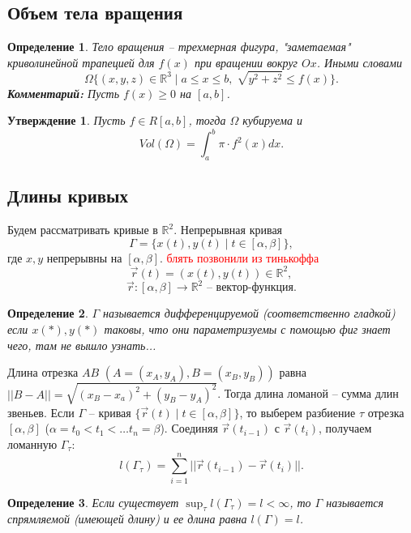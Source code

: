 \documentclass{article}
\theoremstyle{plain}
\newtheorem{claim}{Утверждение}
\newtheorem{definition}{Определение}
\theoremstyle{definition}
\theoremstyle{remark}
\renewcommand{\*}{\cdot}
\begin{document}
\subsection{Объем тела вращения}
\begin{definition}
Тело вращения -- трехмерная фигура, "заметаемая" криволинейной трапецией для $f(x)$ при вращении вокруг $Ox$. Иными словами
$$\Omega \Big\{ (x, y, z)\in \mathbb{R}^3 \;\Big|\; a\leq x\leq b,\; \sqrt{y^2+z^2}\leq f(x) \Big\}.$$
\textbf{Комментарий:} Пусть $f(x) \geq 0$ на $[a, b]$.
\end{definition}

\begin{claim}
Пусть $f\in R[a, b]$, тогда $\Omega$ кубируема и 
$$Vol(\Omega) = \int_a^b \pi\cdot f^2(x)dx.$$
\end{claim}

\subsection{Длины кривых}
Будем рассматривать кривые в $\mathbb{R}^2$. 
Непрерывная кривая $$\Gamma = \Big\{x(t), y(t)\;\Big|\;t\in[\alpha, \beta]\Big\},$$ где $x, y$ непрерывны на $[\alpha, \beta]$.  
\textcolor{red}{блять позвонили из тинькоффа} 
$$\overrightarrow{r}(t) = (x(t), y(t)) \in \mathbb{R}^2,$$
$$\overrightarrow{r} : [\alpha, \beta] \rightarrow \mathbb{R}^2 \text{ -- вектор-функция.}$$
\begin{definition}
$\Gamma$ называется дифференцируемой (соответственно гладкой) если $x(*), y(*)$ таковы, что они параметризуемы с помощью фиг знает чего, там не вышло узнать...
\end{definition}


Длина отрезка $AB$ $(A=(x_A, y_A), B = (x_B, y_B))$ равна $||B-A|| = \sqrt{(x_B -x_a)^2 + (y_B-y_A)^2}$.
Тогда длина ломаной -- сумма длин звеньев.
Если $\Gamma$ -- кривая $\Big\{\overrightarrow{r}(t)\; | \; t \in [\alpha, \beta]\Big\}$, то выберем разбиение $\tau$ отрезка $[\alpha, \beta]$ ($\alpha = t_0<t_1<\ldots t_{n} =\beta$).
Соединяя $\overrightarrow{r}(t_{i-1})$ с $\overrightarrow{r}(t_i)$, получаем ломанную $\Gamma_{\tau}$:
$$l(\Gamma_{\tau}) = \sum_{i=1}^{n} ||\overrightarrow{r}(t_{i-1}) - \overrightarrow{r}(t_i) ||.$$

\begin{definition}
Если существует $\sup_{\tau} l(\Gamma_{\tau}) = l< \infty$, то $\Gamma$ называется спрямляемой (имеющей длину) и ее длина равна $l(\Gamma) = l$.
\end{definition}
\end{document}
